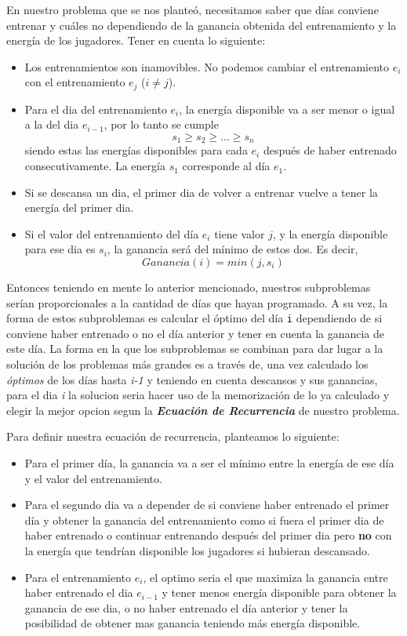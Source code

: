 En nuestro problema que se nos planteó, necesitamos saber que días conviene entrenar y cuáles no dependiendo de la ganancia obtenida del entrenamiento y la energía de los jugadores. Tener en cuenta lo siguiente:
\begin{itemize}
    \item Los entrenamientos son inamovibles. No podemos cambiar el entrenamiento $e_i$ con el entrenamiento $e_j$ ($i \neq j$).
	\item Para el dia del entrenamiento $e_i$, la energía disponible va a ser menor o igual a la del dia $e_{i-1}$, por lo tanto se cumple
	\[ s_1 \geq s_2 \geq ... \geq s_n \]
	siendo estas las energías disponibles para cada $e_i$ después de haber entrenado consecutivamente. La energía $s_1$ corresponde al día $e_1$.
	\item Si se descansa un dia, el primer dia de volver a entrenar vuelve a tener la energía del primer dia.
	\item Si el valor del entrenamiento del día $e_i$ tiene valor $j$, y la energía disponible para ese dia es $s_i$, la ganancia será del mínimo de estos dos. Es decir,
	\[ Ganancia(i) = min(j, s_i) \]
\end{itemize}
Entonces teniendo en mente lo anterior mencionado, nuestros subproblemas serían proporcionales a la cantidad de días que hayan programado. A su vez, la forma de estos subproblemas es calcular el óptimo del día \texttt{i} dependiendo de si conviene haber entrenado o no el día anterior y tener en cuenta la ganancia de este día. La forma en la que los subproblemas se combinan para dar lugar a la solución de los problemas más grandes es a través de, una vez calculado los \textit{óptimos} de los días hasta \textit{i-1} y teniendo en cuenta descansos y sus ganancias, para el dia \textit{i} la solucion seria hacer uso de la memorización de lo ya calculado y elegir la mejor opcion segun la \textbf{\textit{Ecuación de Recurrencia}} de nuestro problema.

Para definir nuestra ecuación de recurrencia, planteamos lo siguiente:
\begin{itemize}
	\item Para el primer día, la ganancia va a ser el mínimo entre la energía de ese día y el valor del entrenamiento.
	\item Para el segundo dia va a depender de si conviene haber entrenado el primer día y obtener la ganancia del entrenamiento como si fuera el primer dia de haber entrenado o continuar entrenando después del primer dia pero \textbf{no} con la energía que tendrían disponible los jugadores si hubieran descansado.
	\item Para el entrenamiento $e_i$, el optimo seria el que maximiza la ganancia entre haber entrenado el dia $e_{i-1}$ y tener menos energía disponible para obtener la ganancia de ese dia, o no haber entrenado el día anterior y tener la posibilidad de obtener mas ganancia teniendo más energía disponible.
\end{itemize}

